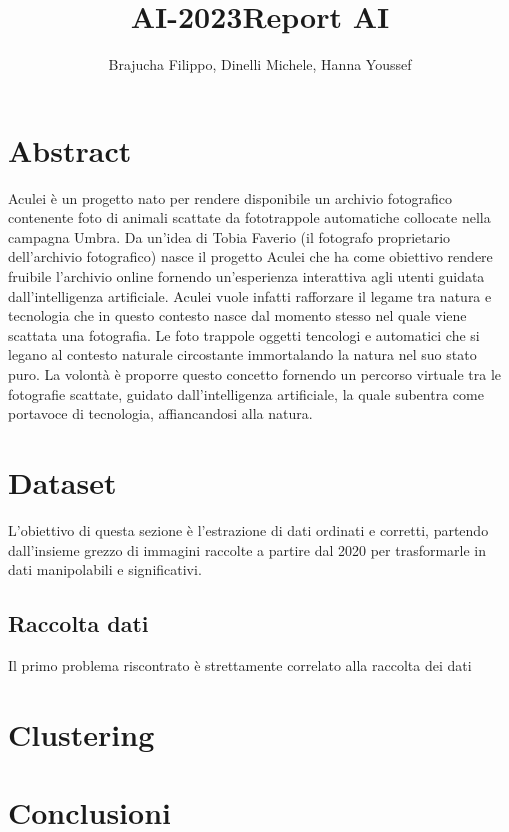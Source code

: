 \title{AI-2023}\documentclass[12pt,a4paper,twoside]{article}
\author{Brajucha Filippo, Dinelli Michele, Hanna Youssef}
\title{Report AI}
\begin{document}
\maketitle

\section*{Abstract}
Aculei è un progetto nato per rendere disponibile un archivio fotografico contenente foto di animali scattate 
da fototrappole automatiche collocate nella campagna Umbra. Da un'idea di Tobia Faverio (il fotografo proprietario dell'archivio fotografico)
nasce il progetto Aculei che ha come obiettivo rendere fruibile l'archivio online fornendo un'esperienza interattiva agli utenti guidata
dall'intelligenza artificiale. Aculei vuole infatti rafforzare il legame tra natura e tecnologia che in questo contesto nasce dal momento stesso
nel quale viene scattata una fotografia. Le foto trappole oggetti tencologi e automatici che si legano al contesto naturale circostante immortalando
la natura nel suo stato puro. La volontà è proporre questo concetto fornendo un percorso virtuale tra le fotografie scattate, guidato dall'intelligenza
artificiale, la quale subentra come portavoce di tecnologia, affiancandosi alla natura.       
\newpage

\tableofcontents

\newpage

\section{Dataset}
L'obiettivo di questa sezione è l'estrazione di dati ordinati e corretti, partendo dall'insieme grezzo di immagini 
raccolte a partire dal 2020 per trasformarle in dati manipolabili e significativi.

\subsection{Raccolta dati}
Il primo problema riscontrato è strettamente correlato alla raccolta dei dati

\section{Clustering}

\section{Conclusioni}
\end{document}
